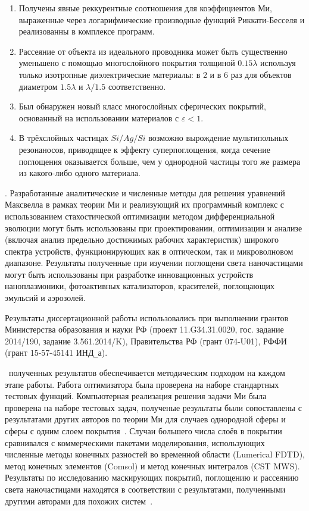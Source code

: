 \begin{enumerate}
  \item Получены явные реккурентные соотношения для коэффициентов Ми,
    выраженные через логарифмические производные функций Риккати-Бесселя
    и реализованны в комплексе
    программ. %
  \item Рассеяние от объекта из идеального проводника может быть
    существенно уменьшено с помощью многослойного покрытия толщиной
    $0.15\lambda$ используя только изотропные диэлектрические
    материалы: в 2 и в 6 раз для объектов диаметром $1.5\lambda$ и
    $\lambda/1.5$ соответственно.
  \item Был обнаружен новый класс многослойных сферических покрытий,
    основанный на использовании материалов с $\varepsilon < 1$.
  \item В трёхслойных частицах $Si/Ag/Si$ возможно вырождение
    мультипольных резонаносов, приводящее к эффекту
    суперпоглощения, когда сечение поглощения оказывается больше, чем
    у однородной частицы того же размера из какого-либо одного материала. 
\end{enumerate}


\influence. Разработанные аналитические и численные методы для решения
уравнений Максвелла в рамках теории Ми и реализующий их
программный комплекс с использованием стахостической оптимизации
методом дифференциальной эволюции могут быть использованы при
проектировании, оптимизации и анализе (включая анализ предельно
достижимых рабочих характеристик) широкого спектра устройств,
функционирующих как в оптическом, так и микроволновом диапазоне.
Результаты полученные при изучении поглощени света наночастицами могут
быть использованы при разработке инновационных устройств
наноплазмоники, фотоактивных катализаторов, красителей, поглощающих
эмульсий и аэрозолей.

Результаты диссертационной работы использовались при выполнении
грантов Министерства образования и науки РФ
(проект 11.G34.31.0020, гос. задание 2014/190, задание 3.561.2014/K),
Правительства РФ (грант 074-U01), РФФИ (грант 15-57-45141 ИНД\verb+_+а).


\reliability\ полученных результатов обеспечивается методическим
подходом на каждом этапе работы. Работа оптимизатора была проверена на
наборе стандартных тестовых функций. Компьютерная реализация решения
задачи Ми была проверена на наборе тестовых задач, полученые
результаты были сопоставлены с результатами других авторов по теории
Ми для случаев однородной сферы и сферы с одним слоем
покрытия~\cite{Suzuki-2013, Bashevoy-2005}.  Случаи большего числа
слоёв в покрытии сравнивался с коммерческими пакетами моделирования,
использующих численные методы конечных разностей во временной области
(Lumerical FDTD), метод конечных элементов (Comsol) и метод конечных
интегралов (CST MWS). Результаты по исследованию маскирующих покрытий,
поглощению и рассеянию света наночастицами находятся в соответствии с
результатами, полученными другими авторами для похожих
систем~\cite{Semouchkina-2013, Alu-2014, Fan-2011}.

